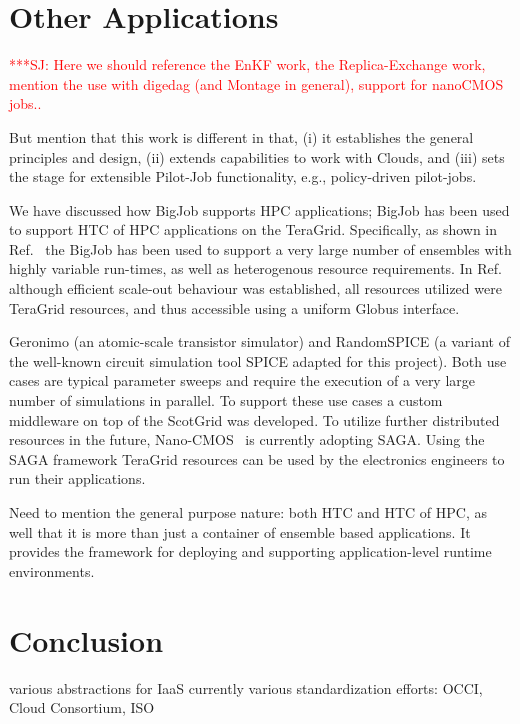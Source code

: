 \documentclass[conference,final]{IEEEtran}
\newcommand{\jhanote}[1]{ {\textcolor{red} { ***SJ: #1 }}}
\newcommand{\jhanote}[1]{}
\begin{document}
\section{Other Applications}

\jhanote{Here we should reference the EnKF work, the Replica-Exchange
  work, mention the use with digedag (and Montage in general), support
  for nanoCMOS jobs..}

But mention that this work is different in that, (i) it establishes
the general principles and design, (ii) extends capabilities to work
with Clouds, and (iii) sets the stage for extensible Pilot-Job
functionality, e.g., policy-driven pilot-jobs.

We have discussed how BigJob supports HPC applications; BigJob has
been used to support HTC of HPC applications on the
TeraGrid. Specifically, as shown in Ref.~\cite{enkf-gmac09} the BigJob
has been used to support a very large number of ensembles with highly
variable run-times, as well as heterogenous resource requirements.  In
Ref.~\cite{enkf-gmac09} although efficient scale-out behaviour was
established, all resources utilized were TeraGrid resources, and thus
accessible using a uniform Globus interface. 

Geronimo (an atomic-scale transistor simulator) and RandomSPICE (a
variant of the well-known circuit simulation tool SPICE adapted for
this project). Both use cases are typical parameter sweeps and require
the execution of a very large number of simulations in parallel. To
support these use cases a custom middleware on top of the ScotGrid was
developed. To utilize further distributed resources in the future,
Nano-CMOS~\cite{nanocmos} is currently adopting SAGA. Using the SAGA
framework TeraGrid resources can be used by the electronics engineers
to run their applications.

Need to mention the general purpose nature: both HTC and HTC of HPC,
as well that it is more than just a container of ensemble based
applications.  It provides the framework for deploying and supporting
application-level runtime environments.

\section{Conclusion}

various abstractions for IaaS currently various standardization
efforts: OCCI, Cloud Consortium, ISO
\end{document}
